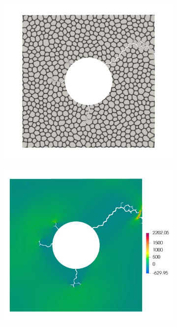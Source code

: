 \begin{figure}[htb!]
\begin{subfigure}[t]{0.32\linewidth}
    \caption{}
  \end{subfigure}
  \begin{subfigure}[t]{0.32\linewidth}
    \centering
    \includegraphics[width=\linewidth]{Chapter3/figures/r5_ext30}
    \caption{}
  \end{subfigure}
  \begin{subfigure}[t]{0.32\linewidth}
    \centering
    \includegraphics[width=\linewidth]{Chapter3/figures/r5_ext30_stress}

\end{subfigure}
\end{figure}
